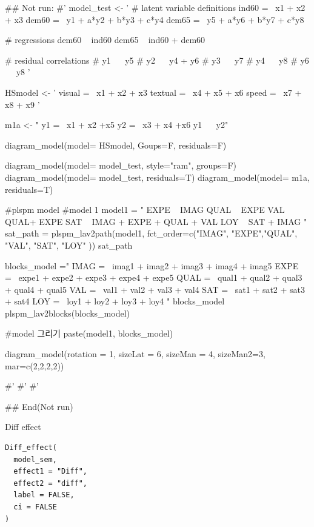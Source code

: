 \documentclass[a4paper]{book}
\begin{document}
\begin{Examples}
\begin{ExampleCode}
\#\# Not run: 
#'
model_test <- '
  # latent variable definitions
     ind60 =~ x1 + x2 + x3
     dem60 =~ y1 + a*y2 + b*y3 + c*y4
     dem65 =~ y5 + a*y6 + b*y7 + c*y8

  # regressions
    dem60 ~ ind60
    dem65 ~ ind60 + dem60

  # residual correlations
    # y1 ~~ y5
    # y2 ~~ y4 + y6
    # y3 ~~ y7
    # y4 ~~ y8
    # y6 ~~ y8
'

HSmodel <- ' visual  =~ x1 + x2 + x3
             textual =~ x4 + x5 + x6
             speed   =~ x7 + x8 + x9 '


m1a <- "
y1 =~ x1 + x2 +x5
y2 =~ x3 + x4 +x6
y1 ~~ y2"

diagram_model(model= HSmodel, Goups=F,  residuals=F)

diagram_model(model= model_test, style="ram", groups=F)
diagram_model(model= model_test, residuals=T)
diagram_model(model= m1a, residuals=T)


#plspm model
#model 1
model1 = "
EXPE ~ IMAG
QUAL ~ EXPE
VAL ~  QUAL+ EXPE
SAT ~ IMAG + EXPE + QUAL + VAL
LOY ~ SAT + IMAG
"
sat_path = plspm_lav2path(model1,
                          fct_order=c("IMAG", "EXPE","QUAL", "VAL", "SAT", "LOY" ))
sat_path

blocks_model ="
IMAG =~ imag1 + imag2 + imag3 + imag4 + imag5
EXPE =~ expe1 + expe2 + expe3 + expe4 + expe5
QUAL =~ qual1 + qual2 + qual3 + qual4 + qual5
VAL =~ val1 + val2 + val3 + val4
SAT =~ sat1 + sat2 + sat3 + sat4
LOY =~ loy1 + loy2 + loy3 + loy4
"
blocks_model
plspm_lav2blocks(blocks_model)

#model 그리기
paste(model1, blocks_model)%

  diagram_model(rotation = 1, sizeLat = 6, sizeMan = 4, sizeMan2=3,
                mar=c(2,2,2,2))

#'
#'
#'

## End(Not run)
\end{ExampleCode}
\end{Examples}
%
\begin{Description}
Diff effect
\end{Description}
%
\begin{Usage}
\begin{verbatim}
Diff_effect(
  model_sem,
  effect1 = "Diff",
  effect2 = "diff",
  label = FALSE,
  ci = FALSE
)
\end{verbatim}
\end{Usage}
\end{document}
